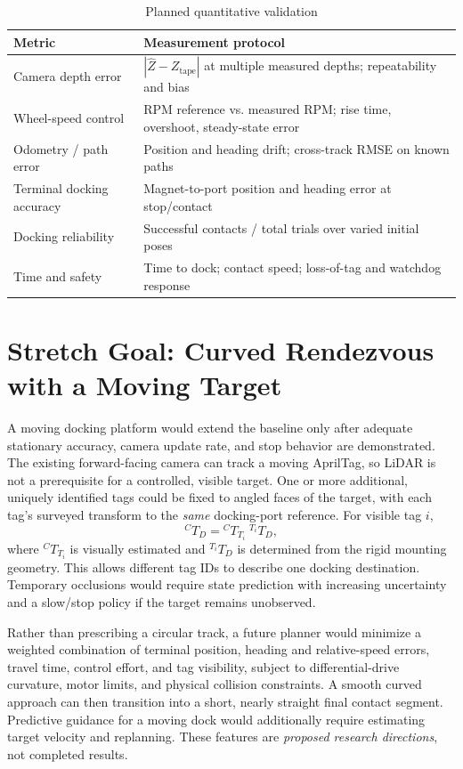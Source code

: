 \documentclass[conference,letterpaper,10pt]{IEEEtran}
\begin{document}
\begin{table}[t]
\centering\caption{Planned quantitative validation}\label{tab:metrics}
\footnotesize
\begin{tabular}{p{1.32in}p{1.65in}}
\toprule
\textbf{Metric} & \textbf{Measurement protocol}\\\midrule
Camera depth error & $|\hat Z-Z_{\mathrm{tape}}|$ at multiple measured depths; repeatability and bias\\
Wheel-speed control & RPM reference vs. measured RPM; rise time, overshoot, steady-state error\\
Odometry / path error & Position and heading drift; cross-track RMSE on known paths\\
Terminal docking accuracy & Magnet-to-port position and heading error at stop/contact\\
Docking reliability & Successful contacts / total trials over varied initial poses\\
Time and safety & Time to dock; contact speed; loss-of-tag and watchdog response\\\bottomrule
\end{tabular}
\end{table}

\section{Stretch Goal: Curved Rendezvous with a Moving Target}
A moving docking platform would extend the baseline only after adequate stationary accuracy, camera update rate, and stop behavior are demonstrated. The existing forward-facing camera can track a moving AprilTag, so LiDAR is not a prerequisite for a controlled, visible target. One or more additional, uniquely identified tags could be fixed to angled faces of the target, with each tag's surveyed transform to the \emph{same} docking-port reference. For visible tag $i$,
\begin{equation}
{}^{C}T_D={}^CT_{T_i}\;{}^{T_i}T_D,
\label{eq:tag}
\end{equation}
where ${}^{C}T_{T_i}$ is visually estimated and ${}^{T_i}T_D$ is determined from the rigid mounting geometry. This allows different tag IDs to describe one docking destination. Temporary occlusions would require state prediction with increasing uncertainty and a slow/stop policy if the target remains unobserved.

Rather than prescribing a circular track, a future planner would minimize a weighted combination of terminal position, heading and relative-speed errors, travel time, control effort, and tag visibility, subject to differential-drive curvature, motor limits, and physical collision constraints. A smooth curved approach can then transition into a short, nearly straight final contact segment. Predictive guidance for a moving dock would additionally require estimating target velocity and replanning. These features are \emph{proposed research directions}, not completed results.
\end{document}
